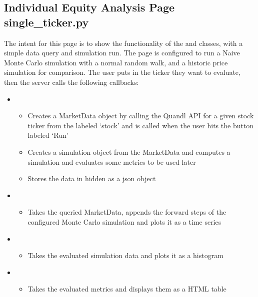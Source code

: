 \documentclass[letterpaper,10pt,english]{sphinxmanual}
\begin{document}
\subsection{Individual Equity Analysis Page \sphinxhyphen{} single\_ticker.py}
\label{\detokenize{dashapp_documentation:individual-equity-analysis-page-single-ticker-py}}
\sphinxAtStartPar
The intent for this page is to show the functionality of the
 and  classes, with a simple data query and
simulation run. The page is configured to run a Naive Monte Carlo
simulation with a normal random walk, and a historic price simulation
for comparison. The user puts in the ticker they want to evaluate, then
the server calls the following callbacks:
\begin{itemize}
\item {} 
\sphinxAtStartPar
{}
\begin{itemize}
\item {} 
\sphinxAtStartPar
Creates a MarketData object by calling the Quandl API for a given
stock ticker from the  labeled
‘stock’ and is called when the user hits the button labeled ‘Run’

\item {} 
\sphinxAtStartPar
Creates a simulation object from the MarketData and computes a
simulation and evaluates some metrics to be used later

\item {} 
\sphinxAtStartPar
Stores the data in hidden  as a json object

\end{itemize}

\item {} 
\sphinxAtStartPar
{}
\begin{itemize}
\item {} 
\sphinxAtStartPar
Takes the queried MarketData, appends the forward steps of the
configured Monte Carlo simulation and plots it as a time series

\end{itemize}

\item {} 
\sphinxAtStartPar
{}
\begin{itemize}
\item {} 
\sphinxAtStartPar
Takes the evaluated simulation data and plots it as a histogram

\end{itemize}

\item {} 
\sphinxAtStartPar
{}
\begin{itemize}
\item {} 
\sphinxAtStartPar
Takes the evaluated metrics and displays them as a HTML table

\end{itemize}

\end{itemize}
\end{document}
